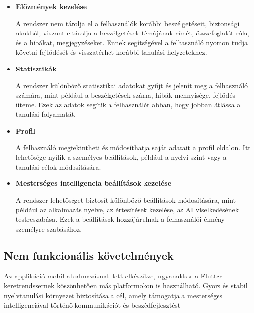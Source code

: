\begin{itemize}
    \item \textbf{Előzmények kezelése}

    A rendszer nem tárolja el a felhasználók korábbi beszélgetéseit, biztonsági okokból, viszont eltárolja a beszélgetések témájának címét, összefoglalót róla, és a hibákat, megjegyzéseket. Ennek segítségével a felhasználó nyomon tudja követni fejlődését és visszatérhet korábbi tanulási helyzetekhez.

    \item \textbf{Statisztikák}

    A rendszer különböző statisztikai adatokat gyűjt és jelenít meg a felhasználó számára, mint például a beszélgetések száma, hibák mennyisége, fejlődés üteme. Ezek az adatok segítik a felhasználót abban, hogy jobban átlássa a tanulási folyamatát.

    \item \textbf{Profil}

    A felhasználó megtekintheti és módosíthatja saját adatait a profil oldalon. Itt lehetősége nyílik a személyes beállítások, például a nyelvi szint vagy a tanulási célok módosítására.

    \item \textbf{Mesterséges intelligencia beállítások kezelése}

    A rendszer lehetőséget biztosít különböző beállítások módosítására, mint például az alkalmazás nyelve, az értesítések kezelése, az AI viselkedésének testreszabása. Ezek a beállítások hozzájárulnak a felhasználói élmény személyre szabásához.

\end{itemize}

\newpage


\newpage
\subsection{Nem funkcionális követelmények}

 Az applikáció mobil alkalmazásnak lett elkészítve, ugyanakkor a Flutter \cite{flutter} keretrendszernek köszönhetően más platformokon is használható. Gyors és stabil nyelvtanulási környezet biztosítása a cél, amely támogatja a mesterséges intelligenciával történő kommunikációt és beszédfejlesztést.

